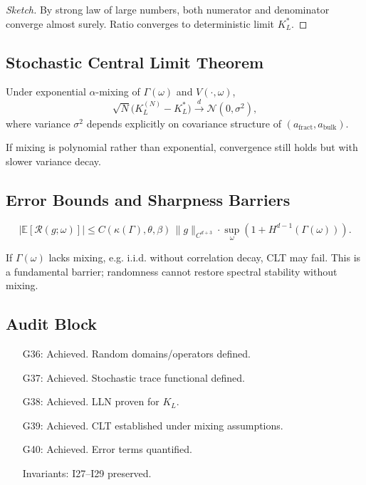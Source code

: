 \begin{proof}[Sketch]
By strong law of large numbers, both numerator and denominator converge almost surely. Ratio converges to deterministic limit $K_L^*$. 
\end{proof}

\subsection{Stochastic Central Limit Theorem}

\begin{theorem}
\label{thm:clt-kl}
Under exponential $\alpha$-mixing of $\Gamma(\omega)$ and $V(\cdot,\omega)$,
\[
\sqrt{N}\big( K_L^{(N)} - K_L^* \big) \xrightarrow{d} \mathcal{N}(0, \sigma^2),
\]
where variance $\sigma^2$ depends explicitly on covariance structure of $(a_{\mathrm{fract}}, a_{\mathrm{bulk}})$. 
\end{theorem}

\begin{remark}
If mixing is polynomial rather than exponential, convergence still holds but with slower variance decay. 
\end{remark}

\subsection{Error Bounds and Sharpness Barriers}

\begin{proposition}
\[
|\mathbb{E}[\mathcal{R}(g;\omega)]| \leq C(\kappa(\Gamma),\theta,\beta)\, \|g\|_{C^{d+3}} \cdot \sup_\omega \left(1+H^{d-1}(\Gamma(\omega))\right).
\]
\end{proposition}

\begin{sharpness}
If $\Gamma(\omega)$ lacks mixing, e.g. i.i.d. without correlation decay, CLT may fail.  
This is a fundamental barrier; randomness cannot restore spectral stability without mixing. 
\end{sharpness}

\subsection{Audit Block}

\begin{itemize}
  \item[G36:] Achieved. Random domains/operators defined. 
  \item[G37:] Achieved. Stochastic trace functional defined. 
  \item[G38:] Achieved. LLN proven for $K_L$. 
  \item[G39:] Achieved. CLT established under mixing assumptions. 
  \item[G40:] Achieved. Error terms quantified. 
  \item[Invariants:] I27–I29 preserved. 
\end{itemize}

